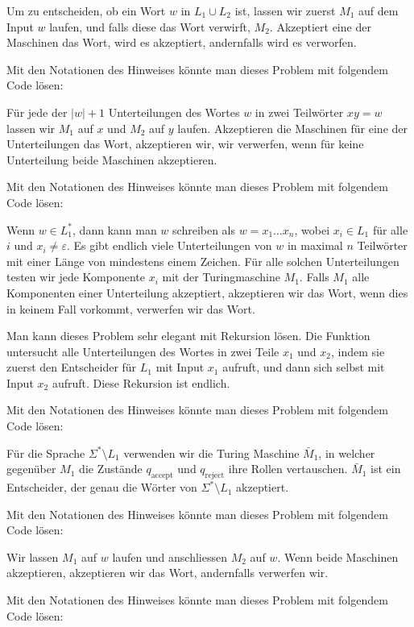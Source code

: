 \begin{loesung}
\begin{teilaufgaben}
\item Um zu entscheiden, ob ein Wort $w$ in $L_1\cup L_2$ ist,
lassen wir zuerst $M_1$ auf dem Input $w$ laufen, und falls
diese das Wort verwirft, $M_2$. Akzeptiert eine der Maschinen
das Wort, wird es akzeptiert, andernfalls wird es verworfen.

Mit den Notationen des Hinweises könnte man dieses Problem mit folgendem
Code lösen:
\item
Für jede der $|w|+1$ Unterteilungen des Wortes $w$ in zwei
Teilwörter $xy=w$ lassen wir $M_1$ auf $x$ und $M_2$ auf
$y$ laufen. Akzeptieren die Maschinen für eine der
Unterteilungen das Wort, akzeptieren wir, wir verwerfen, wenn
für keine Unterteilung beide Maschinen akzeptieren.

Mit den Notationen des Hinweises könnte man dieses Problem mit folgendem
Code lösen:
\item
Wenn $w\in L_1^*$, dann kann man $w$ schreiben als
$w=x_1\dots x_n$, wobei $x_i\in L_1$ für alle $i$ und
$x_i\ne \varepsilon$.
Es gibt endlich viele Unterteilungen von $w$ in maximal $n$ Teilwörter
mit einer Länge von mindestens einem Zeichen.
Für alle solchen Unterteilungen testen wir jede Komponente $x_i$ mit der
Turingmaschine $M_1$.
Falls $M_1$ alle Komponenten einer Unterteilung
akzeptiert, akzeptieren wir das Wort, wenn dies in keinem Fall
vorkommt, verwerfen wir das Wort.

Man kann dieses Problem sehr elegant mit Rekursion lösen.
Die Funktion untersucht alle Unterteilungen des Wortes in
zwei Teile $x_1$ und $x_2$, indem sie zuerst den Entscheider
für $L_1$ mit Input $x_1$ aufruft, und dann sich selbst
mit Input $x_2$ aufruft. Diese Rekursion ist endlich.

Mit den Notationen des Hinweises könnte man dieses Problem mit folgendem
Code lösen:
\item
Für die Sprache $\Sigma^*\setminus L_1$ verwenden wir die
Turing Maschine $\bar M_1$, in welcher gegenüber $M_1$
die Zustände $q_{\text{accept}}$ und $q_{\text{reject}}$
ihre Rollen vertauschen. $\bar M_1$ ist ein Entscheider,
der genau die Wörter von $\Sigma^*\setminus L_1$ akzeptiert.

Mit den Notationen des Hinweises könnte man dieses Problem mit folgendem
Code lösen:
\item
Wir lassen $M_1$ auf $w$ laufen und anschliessen $M_2$ auf $w$.
Wenn beide Maschinen akzeptieren, akzeptieren wir das Wort, andernfalls
verwerfen wir.

Mit den Notationen des Hinweises könnte man dieses Problem mit folgendem
Code lösen:
\end{teilaufgaben}
\end{loesung}

